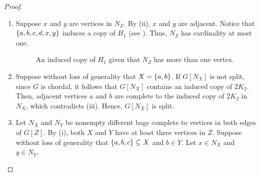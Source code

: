 \begin{proof}
\begin{enumerate}[label=(\roman*)]
\begin{figure}[htb!]
                \caption{An induced copy of $C_4$ given that $N_X$ is not a clique.}
                \label{fig:chordal_types_clique_bag}
            \end{figure}
        \item Suppose $x$ and $y$ are vertices in $N_Z$. By (ii), $x$ and $y$
            are adjacent. Notice that $\left\{a,b,c,d,x,y\right\}$ induces a copy of $H_1$
            (see ). Thus, $N_Z$ has cardinality at
            most one.

            \begin{figure}[htb!]
                \centering
                \caption{An induced copy of $H_1$ given that $N_Z$ has more than one vertex.}
                \label{fig:chordal_types_1}
            \end{figure}
        \item Suppose without loss of generality that $X=\left\{a,b\right\}$. If $G[N_X]$
            is not split, since $G$ is chordal, it follows that $G[N_X]$
            contains an induced copy of $2K_2$. Then, adjacent vertices $a$ and
            $b$ are complete to the induced copy of $2K_2$ in $N_X$, which
            contradicts (iii). Hence, $G[N_X]$ is split.
        \item Let $N_X$ and $N_Y$ be nonempty different bags complete to
            vertices in both edges of $G[Z]$. By (i), both $X$ and $Y$ have at
            least three vertices in $Z$. Suppose without loss of generality that
            $\left\{a,b,c\right\}\subseteq X$ and $b\in Y$. Let $x\in N_X$ and $y\in N_Y$.


\end{enumerate}
\end{proof}

